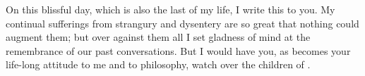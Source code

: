 \documentclass{stex}
\begin{document}

\noindent On this blissful day, which is also the last of my life, I write this to you.
My continual sufferings from strangury and dysentery are so great that nothing could augment them; but over against them all I set gladness of mind at the remembrance of our past conversations.
But I would have you, as becomes your life-long attitude to me and to philosophy, watch over the children of .
\end{document}
